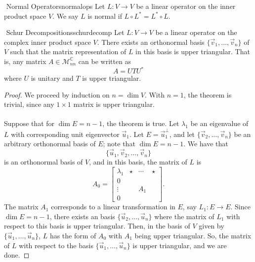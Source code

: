         \begin{definition}{\Stop\,\,Normal Operators}{normalops}
            Let \(L:V\to V\) be a linear operator on the inner product space \(V\). We say \(L\) is normal if \(L\circ L^*=L^*\circ L\).
        \end{definition}
        \begin{theorem}{\Stop\,\,Schur Decompositions}{schurdecomp}
            Let \(L:V\to V\) be a linear operator on the complex inner product space \(V\). There exists an orthonormal basis \(\{\vec{v}_1,\ldots,\vec{v}_n\}\) of \(V\) such that the matrix representation of \(L\) in this basis is upper triangular. That is, any matrix \(A\in\mathcal{M}_{nn}^{\mathbb{C}}\) can be written as
            \begin{equation*}
                A=UTU^*
            \end{equation*}
            where \(U\) is unitary and \(T\) is upper triangular.
            \begin{proof}
                We proceed by induction on \(n=\dim V\). With \(n=1\), the theorem is trivial, since any \(1\times 1\) matrix is upper triangular.
                \\
                \\
                Suppose that for \(\dim E=n-1\), the theorem is true. Let \(\lambda_1\) be an eigenvalue of \(L\) with corresponding unit eigenvector \(\vec{u}_1\). Let \(E=\vec{u}_1^\perp\), and let \(\{\vec{v}_2,\ldots,\vec{v}_n\}\) be an arbitrary orthonormal basis of \(E\); note that \(\dim E=n-1\). We have that
                \begin{equation*}
                    \{\vec{u}_1,\vec{v}_2,\ldots,\vec{v}_n\}
                \end{equation*}
                is an orthonormal basis of \(V\), and in this basis, the matrix of \(L\) is
                \begin{equation*}
                    A_0=\begin{bmatrix}
                            \lambda_1 & \star & \cdots & \star \\
                                0 &       &        &       \\
                            \vdots &       &     A_1 &       \\
                                0 &       &        &
                        \end{bmatrix}.
                \end{equation*}
                The matrix \(A_1\) corresponds to a linear transformation in \(E\), say \(L_1:E\to E\). Since \(\dim E=n-1\), there exists an basis \(\{\vec{u}_2,\ldots,\vec{u}_n\}\) where the matrix of \(L_1\) with respect to this basis is upper triangular. Then, in the basis of \(V\) given by \(\{\vec{u}_1,\ldots,\vec{u}_n\}\), \(L\) has the form of \(A_0\) with \(A_1\) being upper triangular. So, the matrix of \(L\) with respect to the basis \(\{\vec{u}_1,\ldots,\vec{u}_n\}\) is upper triangular, and we are done.
            \end{proof}
        \end{theorem}
